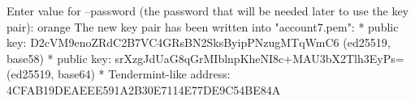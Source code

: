 \begin{shellbox}\begin{ttlst}
Enter value for --password (the password that will be needed later to use the key pair): orange
The new key pair has been written into "account7.pem":
* public key: D2cVM9enoZRdC2B7VC4GRsBN2SksByipPNzugMTqWmC6 (ed25519, base58)
* public key: srXzgJdUaG8qGrMIblnpKheNI8c+MAU3bX2Tlh3EyPs= (ed25519, base64)
* Tendermint-like address: 4CFAB19DEAEEE591A2B30E7114E77DE9C54BE84A
\end{ttlst}\end{shellbox}

